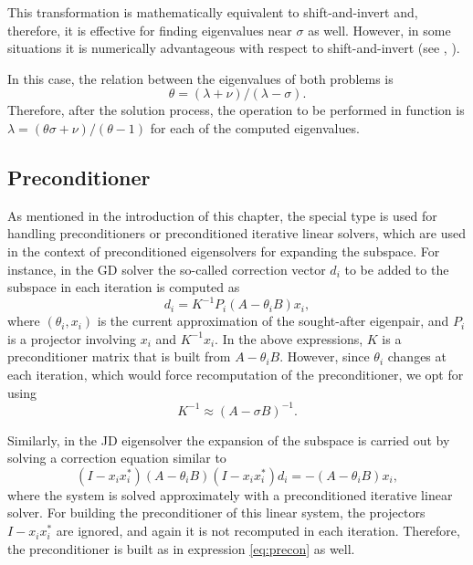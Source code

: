 This transformation is mathematically equivalent to shift-and-invert and, therefore, it is effective for finding eigenvalues near $\sigma$ as well. However, in some situations it is numerically advantageous with respect to shift-and-invert (see \citep[\S 11.2]{Bai:2000:TSA}, \citep{Lehoucq:2001:LEC}).

In this case, the relation between the eigenvalues of both problems is
\begin{equation}\theta=(\lambda+\nu)/(\lambda-\sigma).\end{equation}
Therefore, after the solution process, the operation to be performed in function  is $\lambda=(\theta\sigma+\nu)/(\theta-1)$ for each of the computed eigenvalues.

\subsection{Preconditioner}
\label{sec:precond}

	As mentioned in the introduction of this chapter, the special type  is used for handling preconditioners or preconditioned iterative linear solvers, which are used in the context of preconditioned eigensolvers for expanding the subspace. For instance, in the GD solver the so-called correction vector $d_i$ to be added to the subspace in each iteration is computed as
\begin{equation}
d_i=K^{-1}P_i(A-\theta_i B)x_i,
\end{equation}
where $(\theta_i,x_i)$ is the current approximation of the sought-after eigenpair, and $P_i$ is a projector involving $x_i$ and $K^{-1}x_i$. In the above expressions, $K$ is a preconditioner matrix that is built from $A-\theta_i B$. However, since $\theta_i$ changes at each iteration, which would force recomputation of the preconditioner, we opt for using
\begin{equation}
\label{eq:precon}
K^{-1}\approx (A-\sigma B)^{-1}.
\end{equation}

	Similarly, in the JD eigensolver the expansion of the subspace is carried out by solving a correction equation similar to
\begin{equation}
(I-x_ix_i^*)(A-\theta_i B)(I-x_ix_i^*)d_i=-(A-\theta_i B)x_i,
\end{equation}
where the system is solved approximately with a preconditioned iterative linear solver. For building the preconditioner of this linear system, the projectors $I-x_ix_i^*$ are ignored, and again it is not recomputed in each iteration. Therefore, the preconditioner is built as in expression \ref{eq:precon} as well.

